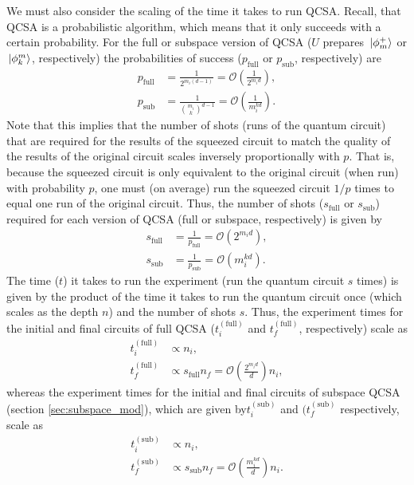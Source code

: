 \documentclass[Dual]{msu-thesis}
\begin{document}
We must also consider the scaling of the time it takes to run QCSA. Recall, that QCSA is a probabilistic algorithm, which means that it only succeeds with a certain probability. For the full or subspace version of QCSA ($U$ prepares $\ket*{\phi^+_m}$ or $\ket*{\phi^m_k}$, respectively) the probabilities of success ($p_{\text{full}}$ or $p_{\text{sub}}$, respectively) are
\begin{align}
p_{\text{full}} 
&=
\frac{1}{2^{m_i(d-1)}}
=
\mathcal{O}\left(\frac{1}{2^{m_id}}\right),
\\
p_{\text{sub}} 
&=
\frac{1}{{m_i \choose k}^{d-1}} 
=
\mathcal{O}\left(\frac{1}{m_i^{kd}}\right).
\end{align}
Note that this implies that the number of shots (runs of the quantum circuit) that are required for the results of the squeezed circuit to match the quality of the results of the original circuit scales inversely proportionally with $p$. That is, because the squeezed circuit is only equivalent to the original circuit (when run) with probability $p$, one must (on average) run the squeezed circuit $1/p$ times to equal one run of the original circuit. Thus, the number of shots ($s_{\text{full}}$ or $s_{\text{sub}}$) required for each version of QCSA (full or subspace, respectively) is given by
\begin{align}
s_{\text{full}} 
&=
\frac{1}{p_{\text{full}}}
=
\mathcal{O}\left(2^{m_id}\right),
\\
s_{\text{sub}} 
&=
\frac{1}{p_{\text{sub}}} 
=
\mathcal{O}\left(m_i^{kd}\right).
\end{align}
The time ($t$) it takes to run the experiment (run the quantum circuit $s$ times) is given by the product of the time it takes to run the quantum circuit once (which scales as the depth $n$) and the number of shots $s$. Thus, the experiment times for the initial and final circuits of full QCSA ($t^{(\text{full})}_i$ and $t^{(\text{full})}_f$, respectively) scale as
\begin{align}
t^{(\text{full})}_i
&\propto
n_i,
\\
t^{(\text{full})}_f
&\propto
s_{\text{full}}n_f
=
\mathcal{O}\left(\frac{2^{m_id}}{d}\right)n_i,
\end{align}
whereas the experiment times for the initial and final circuits of subspace QCSA (section \ref{sec:subspace_mod}), which are given by$t^{(\text{sub})}_i$ and $(t^{(\text{sub})}_f$ respectively, scale as
\begin{align}
t^{(\text{sub})}_i
&\propto
n_i,
\\
t^{(\text{sub})}_f
&\propto
s_{\text{sub}}n_f
=
\mathcal{O}\left(\frac{m_i^{kd}}{d}\right)n_i.
\end{align}
\end{document}
